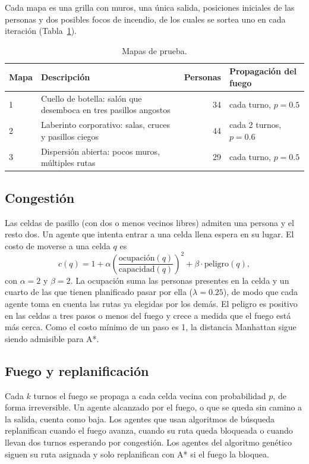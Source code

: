 \documentclass[11pt,a4paper]{article}
\begin{document}
Cada mapa es una grilla con muros, una única salida, posiciones iniciales de las personas y dos posibles focos de incendio, de los cuales se sortea uno en cada iteración (Tabla~\ref{tab:mapas}).

\begin{table}[H]
\centering
\caption{Mapas de prueba.}
\label{tab:mapas}
\begin{tabular}{lp{6.3cm}rl}
\toprule
Mapa & Descripción & Personas & Propagación del fuego \\
\midrule
1 & Cuello de botella: salón que desemboca en tres pasillos angostos & 34 & cada turno, $p = 0.5$ \\
2 & Laberinto corporativo: salas, cruces y pasillos ciegos & 44 & cada 2 turnos, $p = 0.6$ \\
3 & Dispersión abierta: pocos muros, múltiples rutas & 29 & cada turno, $p = 0.5$ \\
\bottomrule
\end{tabular}
\end{table}

\subsection{Congestión}

Las celdas de pasillo (con dos o menos vecinos libres) admiten una persona y el resto dos. Un agente que intenta entrar a una celda llena espera en su lugar. El costo de moverse a una celda $q$ es
\begin{equation}
    c(q) = 1 + \alpha \left( \frac{\text{ocupación}(q)}{\text{capacidad}(q)} \right)^2 + \beta \cdot \text{peligro}(q),
\end{equation}
con $\alpha = 2$ y $\beta = 2$. La ocupación suma las personas presentes en la celda y un cuarto de las que tienen planificado pasar por ella ($\lambda = 0.25$), de modo que cada agente toma en cuenta las rutas ya elegidas por los demás. El peligro es positivo en las celdas a tres pasos o menos del fuego y crece a medida que el fuego está más cerca. Como el costo mínimo de un paso es 1, la distancia Manhattan sigue siendo admisible para A*.

\subsection{Fuego y replanificación}

Cada $k$ turnos el fuego se propaga a cada celda vecina con probabilidad $p$, de forma irreversible. Un agente alcanzado por el fuego, o que se queda sin camino a la salida, cuenta como baja. Los agentes que usan algoritmos de búsqueda replanifican cuando el fuego avanza, cuando su ruta queda bloqueada o cuando llevan dos turnos esperando por congestión. Los agentes del algoritmo genético siguen su ruta asignada y solo replanifican con A* si el fuego la bloquea.
\end{document}
